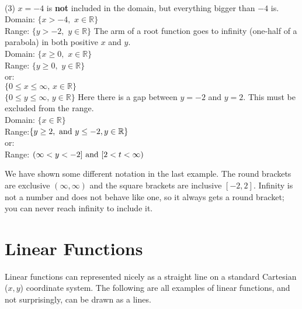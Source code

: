 \solution \\
\begin{tasks}(3)
	\task $x=-4$ is \textbf{not} included in the domain, but everything bigger than $-4$ is.\\ Domain: $\{x>-4,\,\, x\in\mathbb{R}\}$\\ Range: $\{y>-2,\,\, y\in\mathbb{R}\}$
	\task The arm of a root function goes to infinity (one-half of a parabola) in both positive $x$ and $y$.\\ Domain: $\{x\ge0,\,\, x\in\mathbb{R}\}$\\ Range: $\{y\ge0,\,\, y\in\mathbb{R}\}$\\or:\\
	$\{0\le x\le\infty,\, x\in\mathbb{R}\}$\\
	$\{0\le y\le\infty,\, y\in\mathbb{R}\}$
	\task Here there is a gap between $y=-2$ and $y=2$. This must be excluded from the range.\\
	Domain: $\{x\in\mathbb{R}\}$\\ 
	Range:$\{y\ge2,\text{ and } y\le-2,\\y\in\mathbb{R}\}$\\or:\\
	Range: $(\infty<y<-2] \\\text{ and } [2<t<\infty)$	
\end{tasks}
We have shown some different notation in the last example. The round brackets are exclusive $(\infty,\infty)$ and the square brackets are inclusive $[-2,2]$. Infinity is not a number and does not behave like one, so it always gets a round bracket; you can never reach infinity to include it.

\section*{Linear Functions}
Linear functions can represented nicely as a straight line on a standard Cartesian ($x,y$) coordinate system. The following are all examples of linear functions, and not surprisingly, can be drawn as a lines.

